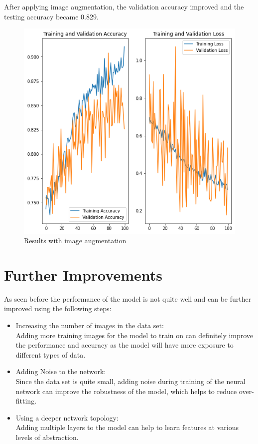 \documentclass[10pt,twocolumn,letterpaper]{article}
\begin{document}
After applying image augmentation, the validation accuracy improved and the testing accuracy became 0.829. 
\begin{figure}[h]
    \centering
    \includegraphics[scale= 0.3]{images/with_augmentation.png}
    \caption{Results with image augmentation}
    \label{fig:with_augmentation}
\end{figure}

\section{Further Improvements}
As seen before the performance of the model is not quite well and can be further improved using the following steps: 
\begin{itemize}
    \item Increasing the number of images in the data set:\\
    Adding more training images for the model to train on can definitely improve the performance and accuracy as the model will have more exposure to different types of data. 
    \item Adding Noise to the network:\\
    Since the data set is quite small, adding noise during training of the neural network can improve the robustness of the model, which helps to reduce over-fitting. \cite{noise}
    \item Using a deeper network topology:\\
    Adding multiple layers to the model can help to learn features at various levels of abstraction. 
\end{itemize}

{\small


}
\end{document}
